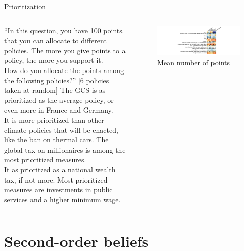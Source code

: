 \begin{framefont}{\small}
\begin{frame}{Prioritization\label{}}
    \begin{columns}
        \begin{column}{0.45\textwidth}
            \bbvs \ip ``In this question, you have 100 points that you can allocate to different policies. The more you give points to a policy, the more you support it.\\ %
            How do you allocate the points among the following policies?'' [6 policies taken at random]
            \ip The GCS is as prioritized as the average policy, or even more in France and Germany. \\ It is more prioritized than other climate policies that will be enacted, like the ban on thermal cars.
            \ip The global tax on millionaires is among the most prioritized measures.\\ It as prioritzed as a national wealth tax, if not more.
            \ip Most prioritized measures are investments in public services and a higher minimum wage.
            \ee        
        \end{column}
        \begin{column}{0.55\textwidth}\vspace{-.2cm}
            \begin{figure}
                \centering 
                \caption{Mean number of points}
                \vspace{-.2cm}
                \includegraphics[width=\columnwidth]{../figures/country_comparison/points_mean.pdf} 
            \end{figure}
        \end{column}
    \end{columns}
\end{frame}

\section{Second-order beliefs}


\end{framefont}
